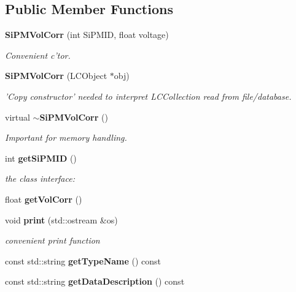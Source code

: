 \subsection*{Public Member Functions}
\begin{DoxyCompactItemize}
\item 
{\bf Si\-P\-M\-Vol\-Corr} (int Si\-P\-M\-I\-D, float voltage)\label{classCALICE_1_1SiPMVolCorr_a3346e0a35860a44163b74ae3510fe957}

\begin{DoxyCompactList}\small\item\em Convenient c'tor. \end{DoxyCompactList}\item 
{\bf Si\-P\-M\-Vol\-Corr} (L\-C\-Object $\ast$obj)\label{classCALICE_1_1SiPMVolCorr_a99e6434d82640a89d43c59c125014d5f}

\begin{DoxyCompactList}\small\item\em 'Copy constructor' needed to interpret L\-C\-Collection read from file/database. \end{DoxyCompactList}\item 
virtual {\bf $\sim$\-Si\-P\-M\-Vol\-Corr} ()\label{classCALICE_1_1SiPMVolCorr_ae0c3a7f5823b765335175f54b7886024}

\begin{DoxyCompactList}\small\item\em Important for memory handling. \end{DoxyCompactList}\item 
int {\bf get\-Si\-P\-M\-I\-D} ()\label{classCALICE_1_1SiPMVolCorr_a2f24c8b0c72e8e4238e04ce92fc2dd2e}

\begin{DoxyCompactList}\small\item\em the class interface\-: \end{DoxyCompactList}\item 
float {\bfseries get\-Vol\-Corr} ()\label{classCALICE_1_1SiPMVolCorr_ad9c4a3fd90f565c1919b3353b082a717}

\item 
void {\bf print} (std\-::ostream \&os)\label{classCALICE_1_1SiPMVolCorr_a5434b764d344b24ce8f21006b43eb52e}

\begin{DoxyCompactList}\small\item\em convenient print function \end{DoxyCompactList}\item 
const std\-::string {\bfseries get\-Type\-Name} () const \label{classCALICE_1_1SiPMVolCorr_a3299bdb8b4986f2eef6829320116dba7}

\item 
const std\-::string {\bfseries get\-Data\-Description} () const \label{classCALICE_1_1SiPMVolCorr_a7f369893fee47d5131ba81367aa04b38}

\end{DoxyCompactItemize}


